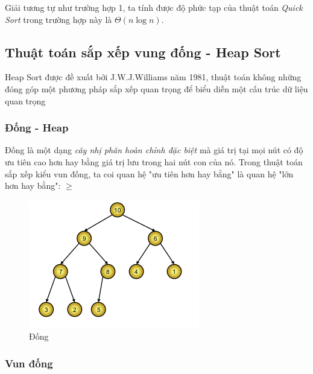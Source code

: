 \documentclass[8pt, a4paper]{article}
\begin{document}
\begin{itemize}
Giải tương tự như trường hợp 1, ta tính được độ phức tạp của thuật toán \emph{Quick Sort} trong trường hợp này là $\Theta(n \log n)$.
\end{itemize}


\subsection{Thuật toán sắp xếp vung đống - Heap Sort}

Heap Sort được đề xuất bởi J.W.J.Williams năm 1981, thuật toán không những đóng góp một phương pháp sắp xếp quan trọng để biểu diễn một cấu trúc dữ liệu quan trọng 

\subsubsection{Đống - Heap}
Đống là một dạng \emph{cây nhị phân hoàn chỉnh đặc biệt} mà giá trị tại mọi nút có độ ưu tiên cao hơn hay bằng giá trị lưu trong hai nút con của nó. Trong thuật toán sắp xếp kiểu vun đống, ta coi quan hệ "ưu tiên hơn hay bằng" là quan hệ "lớn hơn hay bằng": $ \ge $
\begin{figure}[htb]
\centering
\includegraphics[scale=0.6]{img/heaptree.png}
\caption{Đống}
\label{HeapTree}
\end{figure}

\subsubsection{Vun đống}
\end{document}
